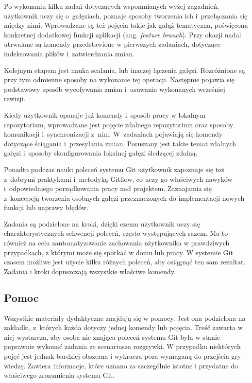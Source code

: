 \documentclass[11pt,a4paper,polish,thesis]{dcsbook}
\begin{document}
	Po wykonaniu kilku zadań dotyczących wspomnianych wyżej zagadnień, użytkownik uczy się o~gałęziach, poznaje sposoby tworzenia ich i~przełączania się między nimi. Wprowadzane są też pojęcia takie jak gałąź tematyczna, poświęcona konkretnej dodatkowej funkcji aplikacji (ang. \textit{feature branch}). Przy okazji nadal utrwalane są komendy przedstawione w pierwszych zadaniach, dotyczące indeksowania plików i~zatwierdzania zmian. 

	Kolejnym etapem jest nauka scalania, lub inaczej łączenia gałęzi. Rozróżnione są przy tym odmienne sposoby na wykonanie tej operacji. Następnie pojawia się podstawowy sposób wycofywania zmian i~usuwania wykonanych wcześniej rewizji. 
	
	Kiedy użytkownik opanuje już komendy i~sposób pracy w lokalnym repozytorium, wprowadzane jest pojęcie zdalnego repozytorium oraz sposoby komunikacji i~synchronizacji z~nim. W~zadaniach pojawiają się komendy dotyczące ściągania i~przesyłania zmian. Poruszany jest także temat zdalnych gałęzi i~sposoby skonfigurowania lokalnej gałęzi śledzącej zdalną.
	
	Ponadto podczas nauki poleceń systemu Git użytkownik zapoznaje się też z~dobrymi praktykami i~metodyką Gitflow, co uczy go właściwych nawyków i~odpowiedniego porządkowania pracy nad projektem. Zaznajamia się z~koncepcją tworzenia osobnych gałęzi przeznaczonych do implementacji nowych funkcji lub naprawy błędów.
	
	Zadania są podzielone na kroki, dzięki czemu użytkownik uczy się charakterystycznych sekwencji poleceń, często występujących razem. Ma to również na celu zautomatyzowanie zachowania użytkownika w prawdziwych przypadkach, z którymi może się spotkać w domu lub pracy. W systemie Git czasem możliwe jest użycie kilku różnych poleceń, aby osiągnąć ten sam rezultat. Zadania i kroki dopuszczają wszystkie właściwe komendy.
	
	\subsection{Pomoc}
	
	Wszystkie materiały dydaktyczne znajdują się w pomocy. Jest ona podzielona na zakładki, z~których każda dotyczy jednej komendy lub pojęcia. Treść zawarta w niej wystarcza, aby osoba nie znająca poleceń systemu Git była w stanie poprawnie wykonać zadania ze scenariusza rozgrywki. W przypadku niektórych pojęć jest jednak bardziej obszerna i wykracza poza wymaganą do przejścia gry wiedzę. Zawiera informacje, które uznano za szczególnie istotne i przydatne do właściwego zrozumienia systemu Git.
	
\end{document}
